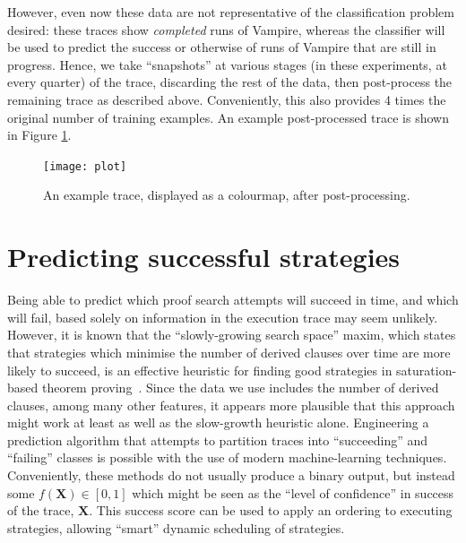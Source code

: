 \documentclass{llncs}
\begin{document}
However, even now these data are not representative of the classification problem desired: these traces show \emph{completed} runs of Vampire, whereas the classifier will be used to predict the success or otherwise of runs of Vampire that are still in progress.
Hence, we take ``snapshots'' at various stages (in these experiments, at every quarter) of the trace, discarding the rest of the data, then post-process the remaining trace as described above.
Conveniently, this also provides 4 times the original number of training examples.
An example post-processed trace is shown in Figure \ref{fig:trace}.

\begin{figure}
	\texttt{[image: plot]}
	\caption{An example trace, displayed as a colourmap, after post-processing.}
	\label{fig:trace}
\end{figure}

\section{Predicting successful strategies} \label{sec:predict}
%
Being able to predict which proof search attempts will succeed in time, and which will fail, based solely on information in the execution trace may seem unlikely.
However, it is known that the ``slowly-growing search space'' maxim, which states that strategies which minimise the number of derived clauses over time are more likely to succeed, is an effective heuristic for finding good strategies in saturation-based theorem proving~\cite{predict-success}.
Since the data we use includes the number of derived clauses, among many other features, it appears more plausible that this approach might work at least as well as the slow-growth heuristic alone.
Engineering a prediction algorithm that attempts to partition traces into ``succeeding'' and ``failing'' classes is possible with the use of modern machine-learning techniques.
Conveniently, these methods do not usually produce a binary output, but instead some \(f(\mathbf{X}) \in \left[0, 1\right]\) which might be seen as the ``level of confidence'' in success of the trace, \(\mathbf{X}\).
This success score can be used to apply an ordering to executing strategies, allowing ``smart'' dynamic scheduling of strategies.
\end{document}
